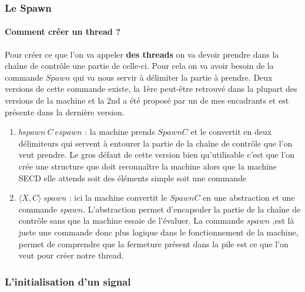 \documentclass[10pt,a4paper]{article}
\begin{document}
					
			\subsubsection{Le Spawn} 
				
				\paragraph{Comment créer un thread ?}
				Pour créer ce que l'on va appeler \textbf{des threads} on va devoir prendre dans la chaîne de contrôle une partie de celle-ci. Pour cela on va avoir besoin de la commande $Spawn$ qui va nous servir à délimiter la partie à prendre. Deux versions de cette commande existe, la 1ère peut-être retrouvé dans la plupart des versions de la machine et la 2nd a été proposé par un de mes encadrants et est présente dans la dernière version.
				\smallbreak
				\begin{enumerate}
					\item $bspawn~C~espawn$ : la machine prends $Spawn C$ et le convertit en deux délimiteurs qui servent à entourer la partie de la chaîne de contrôle que l'on veut prendre. Le gros défaut de cette version bien qu'utilisable c'est que l'on crée une structure que doit reconnaître la machine alors que la machine SECD elle attends soit des éléments simple soit une commande
					\item $\langle X,C\rangle~spawn$ : ici la machine convertit le $Spawn C$ en une abstraction et une commande $spawn$. L'abstraction permet d'encapsuler la partie de la chaîne de contrôle sans que la machine essaie de l'évaluer. La commande $spawn$ ,est là juste une commande donc plus logique dans le fonctionnement de la machine, permet de comprendre que la fermeture présent dans la pile est ce que l'on veut pour créer notre thread. 
				\end{enumerate}
				\medbreak
					
					
					
			\subsubsection{L'initialisation d'un signal}
				
\end{document}
